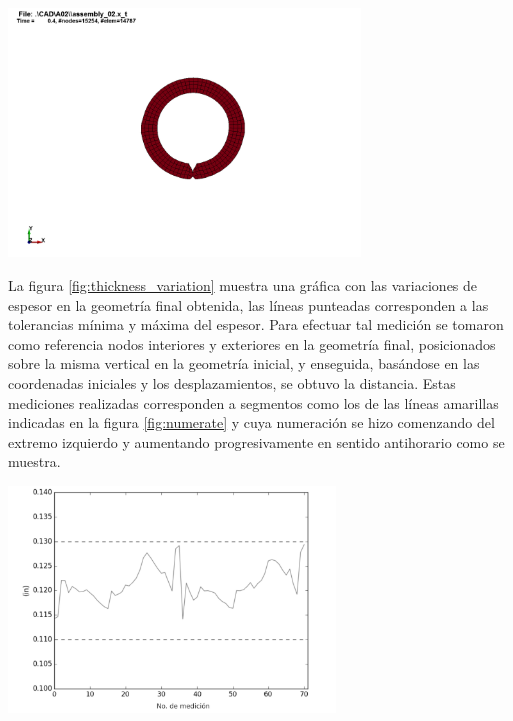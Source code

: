 \begin{center}
\includegraphics[width=0.7\textwidth]{src/ch4/geometry_02.png}
\label{fig:geometry_02}
\end{center}

La figura \ref{fig:thickness_variation} muestra una gráfica con las variaciones de espesor en la geometría 
final obtenida, las líneas punteadas corresponden a las tolerancias mínima y máxima del espesor. Para 
efectuar tal medición se tomaron como referencia nodos interiores y exteriores en la geometría final, 
posicionados sobre la misma vertical en la geometría inicial, y enseguida, basándose en las coordenadas 
iniciales y los desplazamientos, se obtuvo la distancia. Estas mediciones realizadas corresponden a segmentos 
como los de las líneas amarillas indicadas en la figura \ref{fig:numerate} y cuya numeración se hizo 
comenzando del extremo izquierdo y aumentando progresivamente en sentido antihorario como se muestra.

\begin{center}
\includegraphics[width=0.65\textwidth]{src/ch4/thickness_variation.pdf}
\label{fig:thickness_variation}
\end{center}

